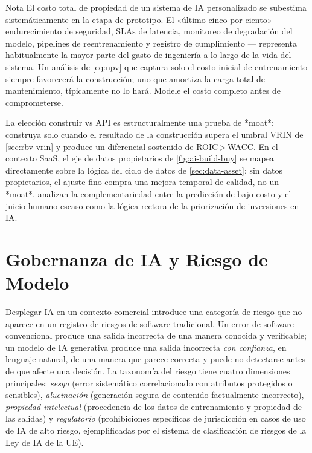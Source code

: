 \begin{admonition}{Nota}
El costo total de propiedad de un sistema de IA personalizado se subestima sistemáticamente en la
etapa de prototipo. El «último cinco por ciento» — endurecimiento de seguridad, SLAs de latencia,
monitoreo de degradación del modelo, pipelines de reentrenamiento y registro de cumplimiento —
representa habitualmente la mayor parte del gasto de ingeniería a lo largo de la vida del sistema.
Un análisis de \cref{eq:npv} que captura solo el costo inicial de entrenamiento siempre favorecerá
la construcción; uno que amortiza la carga total de mantenimiento, típicamente no lo hará.
Modele el costo completo antes de comprometerse.
\end{admonition}

La elección construir vs API es estructuralmente una prueba de *moat*: construya solo cuando el
resultado de la construcción supera el umbral VRIN de \cref{sec:rbv-vrin} y produce un diferencial
sostenido de ROIC\,>\,WACC. En el contexto SaaS, el eje de datos propietarios de
\cref{fig:ai-build-buy} se mapea directamente sobre la lógica del ciclo de datos de
\cref{sec:data-asset}: sin datos propietarios, el ajuste fino compra una mejora temporal de
calidad, no un *moat*. \textcite{agrawal2018prediction} analizan la complementariedad entre la
predicción de bajo costo y el juicio humano escaso como la lógica rectora de la priorización de
inversiones en IA.

\section{Gobernanza de IA y Riesgo de Modelo}\label{sec:ai-governance}

Desplegar IA en un contexto comercial introduce una categoría de riesgo que no aparece en un registro
de riesgos de software tradicional. Un error de software convencional produce una salida incorrecta
de una manera conocida y verificable; un modelo de IA generativa produce una salida incorrecta
\emph{con confianza}, en lenguaje natural, de una manera que parece correcta y puede no detectarse
antes de que afecte una decisión. La taxonomía del riesgo tiene cuatro dimensiones principales:
\emph{sesgo} (error sistemático correlacionado con atributos protegidos o sensibles),
\emph{alucinación} (generación segura de contenido factualmente incorrecto), \emph{propiedad
intelectual} (procedencia de los datos de entrenamiento y propiedad de las salidas) y
\emph{regulatorio} (prohibiciones específicas de jurisdicción en casos de uso de IA de alto
riesgo, ejemplificadas por el sistema de clasificación de riesgos de la Ley de IA de la UE).

